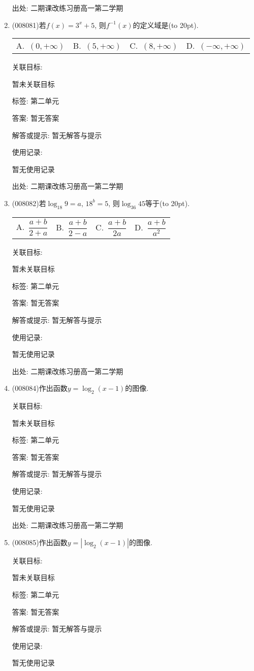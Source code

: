 \documentclass[10pt,a4paper]{article}
\newcommand{\bracket}[1]{(\hbox to #1pt{})}
\newcommand{\fourch}[4]{\par\begin{tabular}{p{.23\textwidth}p{.23\textwidth}p{.23\textwidth}p{.23\textwidth}}
A.~#1 &B.~#2& C.~#3& D.~#4
\end{tabular}}
\begin{document}
\begin{enumerate}[1.]
出处: 二期课改练习册高一第二学期
\item { (008081)}若$f(x)=3^x+5$, 则$f^{-1}(x)$的定义域是\bracket{20}.
\fourch{$(0,+\infty)$}{$(5,+\infty)$}{$(8,+\infty)$}{$(-\infty ,+\infty)$}


关联目标:

暂未关联目标



标签: 第二单元

答案: 暂无答案

解答或提示: 暂无解答与提示

使用记录:

暂无使用记录


出处: 二期课改练习册高一第二学期
\item { (008082)}若$\log _{18}9=a$, $18^b=5$, 则$\log _{36}45$等于\bracket{20}.
\fourch{$\dfrac{a+b}{2+a}$}{$\dfrac{a+b}{2-a}$}{$\dfrac{a+b}{2a}$}{$\dfrac{a+b}{a^2}$}


关联目标:

暂未关联目标



标签: 第二单元

答案: 暂无答案

解答或提示: 暂无解答与提示

使用记录:

暂无使用记录


出处: 二期课改练习册高一第二学期
\item { (008084)}作出函数$y=\log _2(x-1)$的图像.


关联目标:

暂未关联目标



标签: 第二单元

答案: 暂无答案

解答或提示: 暂无解答与提示

使用记录:

暂无使用记录


出处: 二期课改练习册高一第二学期
\item { (008085)}作出函数$y=|\log _2(x-1)|$的图像.


关联目标:

暂未关联目标



标签: 第二单元

答案: 暂无答案

解答或提示: 暂无解答与提示

使用记录:

暂无使用记录



\end{enumerate}
\end{document}
